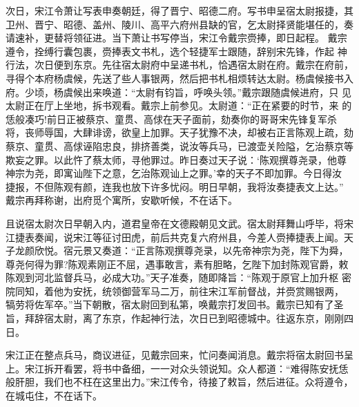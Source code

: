 次日，宋江令萧让写表申奏朝廷，得了晋宁、昭德二府。写书申呈宿太尉报捷，其
卫州、晋宁、昭德、盖州、陵川、高平六府州县缺的官，乞太尉择贤能堪任的，奏
请速补，更替将领征进。当下萧让书写停当，宋江令戴宗赍捧，即日起程。
戴宗遵令，拴缚行囊包裹，赍捧表文书札，选个轻捷军士跟随，辞别宋先锋，作起
神行法，次日便到东京。先往宿太尉府中呈递书札，恰遇宿太尉在府。戴宗在府前，
寻得个本府杨虞候，先送了些人事银两，然后把书札相烦转达太尉。杨虞候接书入
府。少顷，杨虞候出来唤道：“太尉有钧旨，呼唤头领。”戴宗跟随虞候进府，只
见太尉正在厅上坐地，拆书观看。戴宗上前参见。太尉道：“正在紧要的时节，来
的恁般凑巧!前日正被蔡京、童贯、高俅在天子面前，劾奏你的哥哥宋先锋复军杀
将，丧师辱国，大肆诽谤，欲皇上加罪。天子犹豫不决，却被右正言陈观上疏，劾
蔡京、童贯、高俅诬陷忠良，排挤善类，说汝等兵马，已渡壶关险隘，乞治蔡京等
欺妄之罪。以此忤了蔡太师，寻他罪过。昨日奏过天子说：‘陈观撰尊尧录，他尊
神宗为尧，即寓讪陛下之意，乞治陈观讪上之罪。’幸的天子不即加罪。今日得汝
捷报，不但陈观有颜，连我也放下许多忧闷。明日早朝，我将汝奏捷表文上达。”
戴宗再拜称谢，出府觅个寓所，安歇听候，不在话下。

且说宿太尉次日早朝入内，道君皇帝在文德殿朝见文武。宿太尉拜舞山呼毕，将宋
江捷表奏闻，说宋江等征讨田虎，前后共克复六府州县，今差人赍捧捷表上闻。天
子龙颜欣悦。宿元景又奏道：“正言陈观撰尊尧录，以先帝神宗为尧，陛下为舜，
尊尧何得为罪?陈观素刚正不屈，遇事敢言，素有胆略，乞陛下加封陈观官爵，敕
陈观到河北监督兵马，必成大功。”天子准奏，随即降旨：“陈观于原官上加升枢
密院同知，着他为安抚，统领御营军马二万，前往宋江军前督战，并赍赏赐银两，
犒劳将佐军卒。”当下朝散，宿太尉回到私第，唤戴宗打发回书。戴宗已知有了圣
旨，拜辞宿太尉，离了东京，作起神行法，次日已到昭德城中。往返东京，刚刚四
日。

宋江正在整点兵马，商议进征，见戴宗回来，忙问奏闻消息。戴宗将宿太尉回书呈
上。宋江拆开看罢，将书中备细，一一对众头领说知。众人都道：“难得陈安抚恁
般肝胆，我们也不枉在这里出力。”宋江传令，待接了敕旨，然后进征。众将遵令，
在城屯住，不在话下。

